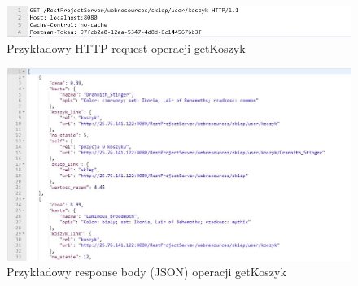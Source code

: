 \documentclass[11pt]{article}   %
\begin{document}
\begin{figure}[H]
	\centering
	\includegraphics[width=0.8\linewidth]{komunikaty_zdjecia_rest/getKoszyk_req}
	\caption{Przykładowy HTTP request operacji getKoszyk}
	\label{zrzut51}
\end{figure}
\begin{figure}[H]
	\centering
	\includegraphics[width=0.8\linewidth]{komunikaty_zdjecia_rest/getKoszyk_res_body}
	\caption{Przykładowy response body (JSON) operacji getKoszyk}
	\label{zrzut52}
\end{figure}
\end{document}
